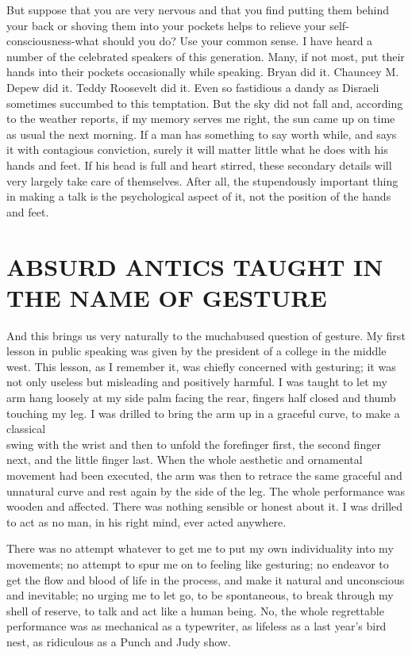 \documentclass[10pt]{article}
\begin{document}
But suppose that you are very nervous and that you find putting them behind your back or shoving them into your pockets helps to relieve your self-\\
consciousness-what should you do? Use your common sense. I have heard a number of the celebrated speakers of this generation. Many, if not most, put their hands into their pockets occasionally while speaking. Bryan did it. Chauncey M. Depew did it. Teddy Roosevelt did it. Even so fastidious a dandy as Disraeli sometimes succumbed to this temptation. But the sky did not fall and, according to the weather reports, if my memory serves me right, the sun came up on time as usual the next morning. If a man has something to say worth while, and says it with contagious conviction, surely it will matter little what he does with his hands and feet. If his head is full and heart stirred, these secondary details will very largely take care of themselves. After all, the stupendously important thing in making a talk is the psychological aspect of it, not the position of the hands and feet.

\section*{ABSURD ANTICS TAUGHT IN THE NAME OF GESTURE}
And this brings us very naturally to the muchabused question of gesture. My first lesson in public speaking was given by the president of a college in the middle west. This lesson, as I remember it, was chiefly concerned with gesturing; it was not only useless but misleading and positively harmful. I was taught to let my arm hang loosely at my side palm facing the rear, fingers half closed and thumb touching my leg. I was drilled to bring the arm up in a graceful curve, to make a classical\\
swing with the wrist and then to unfold the forefinger first, the second finger next, and the little finger last. When the whole aesthetic and ornamental movement had been executed, the arm was then to retrace the same graceful and unnatural curve and rest again by the side of the leg. The whole performance was wooden and affected. There was nothing sensible or honest about it. I was drilled to act as no man, in his right mind, ever acted anywhere.

There was no attempt whatever to get me to put my own individuality into my movements; no attempt to spur me on to feeling like gesturing; no endeavor to get the flow and blood of life in the process, and make it natural and unconscious and inevitable; no urging me to let go, to be spontaneous, to break through my shell of reserve, to talk and act like a human being. No, the whole regrettable performance was as mechanical as a typewriter, as lifeless as a last year's bird nest, as ridiculous as a Punch and Judy show.
\end{document}
